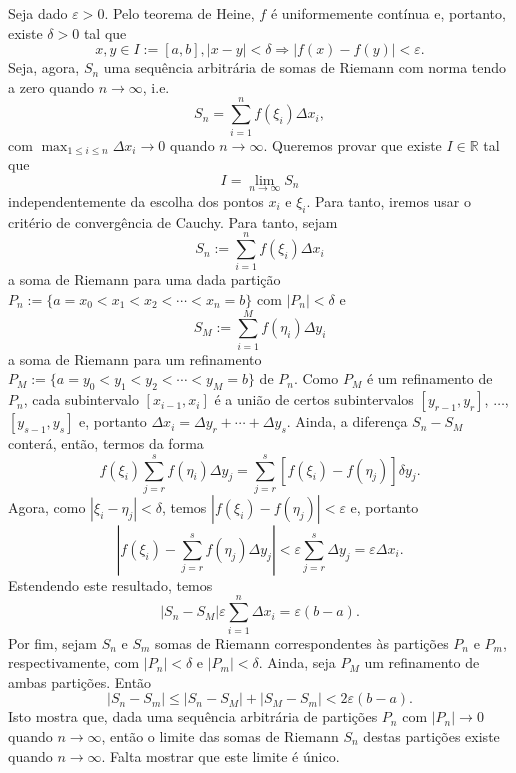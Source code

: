 \begin{dem}
  Seja dado $\varepsilon>0$. Pelo teorema de Heine, $f$ é uniformemente contínua e, portanto, existe $\delta>0$ tal que
  \begin{equation}
    x,y\in I:=[a, b], |x-y|<\delta \Rightarrow |f(x)-f(y)|<\varepsilon.
  \end{equation}
Seja, agora, $S_n$ uma sequência arbitrária de somas de Riemann com norma tendo a zero quando $n\to\infty$, i.e.
\begin{equation}
  S_n = \sum_{i=1}^n f(\xi_i)\Delta x_i,
\end{equation}
com $\max_{1\leq i\leq n}\Delta x_i\to 0$ quando $n\to\infty$. Queremos provar que existe $I\in\mathbb{R}$ tal que
\begin{equation}
  I = \lim_{n\to\infty} S_n
\end{equation}
independentemente da escolha dos pontos $x_i$ e $\xi_i$. Para tanto, iremos usar o critério de convergência de Cauchy. Para tanto, sejam 
\begin{equation}
  S_n := \sum_{i=1}^n f(\xi_i)\Delta x_i
\end{equation}
a soma de Riemann para uma dada partição $P_n := \{a=x_0<x_1<x_2<\cdots <x_n=b\}$ com $|P_n| < \delta$ e 
\begin{equation}
  S_M := \sum_{i=1}^M f(\eta_i)\Delta y_i
\end{equation}
a soma de Riemann para um refinamento $P_M:=\{a=y_0<y_1<y_2<\cdots <y_M=b\}$ de $P_n$. Como $P_M$ é um refinamento de $P_n$, cada subintervalo $[x_{i-1}, x_i]$ é a união de certos subintervalos $[y_{r-1}, y_{r}]$, $\ldots$, $[y_{s-1}, y_{s}]$ e, portanto $\Delta x_i = \Delta y_r + \cdots + \Delta y_s$. Ainda, a diferença $S_n - S_M$ conterá, então, termos da forma
\begin{equation}
  f(\xi_i)\sum_{j=r}^s f(\eta_i)\Delta y_j = \sum_{j=r}^s [f(\xi_i) - f(\eta_j)]\delta y_j.
\end{equation}
Agora, como $|\xi_i-\eta_j|<\delta$, temos $|f(\xi_i) - f(\eta_j)|<\varepsilon$ e, portanto
\begin{equation}
  \left|f(\xi_i) - \sum_{j=r}^s f(\eta_j)\Delta y_j\right| < \varepsilon \sum_{j=r}^s \Delta y_j = \varepsilon\Delta x_i.
\end{equation}
Estendendo este resultado, temos
\begin{equation}
  |S_n - S_M| \varepsilon\sum_{i=1}^n \Delta x_i = \varepsilon (b-a).
\end{equation}
Por fim, sejam $S_n$ e $S_m$ somas de Riemann correspondentes às partições $P_n$ e $P_m$, respectivamente, com $|P_n|<\delta$ e $|P_m|<\delta$. Ainda, seja $P_M$ um refinamento de ambas partições. Então
\begin{equation}
  |S_n - S_m| \leq |S_n - S_M| + |S_M - S_m| < 2\varepsilon (b-a).
\end{equation}
Isto mostra que, dada uma sequência arbitrária de partições $P_n$ com $|P_n|\to 0$ quando $n\to \infty$, então o limite das somas de Riemann $S_n$ destas partições existe quando $n\to\infty$. Falta mostrar que este limite é único.


\end{dem}
